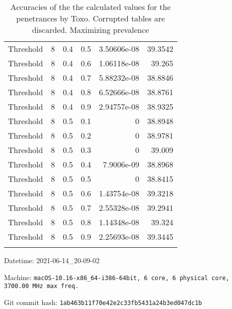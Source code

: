 \documentclass{article}
\begin{document}
\begin{longtable}[H]{lrrrrr}
 Threshold      &       8 &   0.4 &            0.5 &      3.50606e-08 &         39.3542 \\
 Threshold      &       8 &   0.4 &            0.6 &      1.06118e-08 &         39.265  \\
 Threshold      &       8 &   0.4 &            0.7 &      5.88232e-08 &         38.8846 \\
 Threshold      &       8 &   0.4 &            0.8 &      6.52666e-08 &         38.8761 \\
 Threshold      &       8 &   0.4 &            0.9 &      2.94757e-08 &         38.9325 \\
 Threshold      &       8 &   0.5 &            0.1 &      0           &         38.8948 \\
 Threshold      &       8 &   0.5 &            0.2 &      0           &         38.9781 \\
 Threshold      &       8 &   0.5 &            0.3 &      0           &         39.009  \\
 Threshold      &       8 &   0.5 &            0.4 &      7.9006e-09  &         38.8968 \\
 Threshold      &       8 &   0.5 &            0.5 &      0           &         38.8415 \\
 Threshold      &       8 &   0.5 &            0.6 &      1.43754e-08 &         39.3218 \\
 Threshold      &       8 &   0.5 &            0.7 &      2.55328e-08 &         39.2941 \\
 Threshold      &       8 &   0.5 &            0.8 &      1.14348e-08 &         39.324  \\
 Threshold      &       8 &   0.5 &            0.9 &      2.25693e-08 &         39.3445 \\
\hline

\caption{Accuracies of the the calculated values for the penetrances by Toxo. Corrupted tables are discarded. Maximizing prevalence}
\end{longtable}
Datetime: 2021-06-14\_20-09-02

Machine: \texttt{macOS-10.16-x86\_64-i386-64bit, 6 core, 6 physical core, 3700.00 MHz max freq.}

Git commit hash: \texttt{1ab463b11f70e42e2c33fb5431a24b3ed047dc1b}
\end{document}
